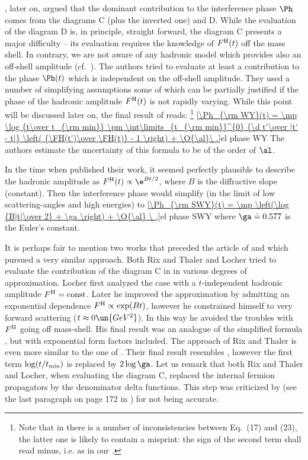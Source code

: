 \WY, later on, argued that the dominant contribution to the interference phase $\Ph$ comes from the diagrams  C (plus the inverted one) and D. While the evaluation of the diagram D is, in principle, straight forward, the diagram C presents a major difficulty -- its evaluation requires the knowledge of $F^{\rm H}(t)$ off the mass shell. In contrary, we are not aware of any hadronic model which provides also an off-shell amplitude (cf.~). The authors tried to evaluate at least a contribution to the phase $\Ph(t)$ which is independent on the off-shell amplitude. They used a number of simplifying assumptions some of which can be partially justified if the phase of the hadronic amplitude $F^{\rm H}(t)$ is not rapidly varying. While this point will be discussed later on, the final result of \WY{} reads: \footnote{%
Note that in  there is a number of inconsistencies between Eq.~(17) and (23), the latter one is likely to contain a misprint: the sign of the second term shall read minus, i.e. as in our .
}
\eqref{\Ph_{\rm WY}(t) = \mp \log {t\over t_{\rm min}} \pm \int\limits_{t_{\rm min}}^{0} {\d t'\over |t' - t|} \left( {\FH(t')\over \FH(t)} - 1 \right) + \O{\al}\ .}{el phase WY}
The authors estimate the uncertainty of this formula to be of the order of $\al$.

In the time when \WY{} published their work, it seemed perfectly plausible to describe the hadronic amplitude as $\FH(t) \propto \e^{Bt/2}$, where $B$ is the diffractive slope (constant). Then the interference phase would simplify (in the limit of low scattering-angles and high energies) to
\eqref{\Ph_{\rm SWY}(t) = \mp \left(\log {B|t|\over 2} + \ga \right) + \O{\al} \ ,}{el phase SWY}
where $\ga \doteq 0.577$ is the Euler's constant.

It is perhaps fair to mention two works that preceded the article of \WaY{}  and which pursued a very similar approach. Both Rix and Thaler  and Locher  tried to evaluate the contribution of the diagram C in  in various degrees of approximation. Locher first analyzed the case with a $t$-independent hadronic amplitude $F^{\rm H}=\hbox{const}$. Later he improved the approximation by admitting an exponential dependence $F^{\rm H} \propto \exp(Bt)$, however he constrained himself to very forward scattering ($t\approx 0\un{GeV^2}$). In this way he avoided the troubles with $F^{\rm H}$ going off mass-shell. His final result was an analogue of the simplified \WaY{} formula , but with exponential form factors included. The approach of Rix and Thaler is even more similar to the one of \WaY. Their final result resembles , however the first term $\log(t/t_{\rm min})$ is replaced by $2\log\ga$. Let us remark that both Rix and Thaler and Locher, when evaluating the diagram C, replaced the internal fermion propagators by the denominator delta functions. This step was criticized by \WaY{} (see the last paragraph on page 172 in ) for not being accurate.



